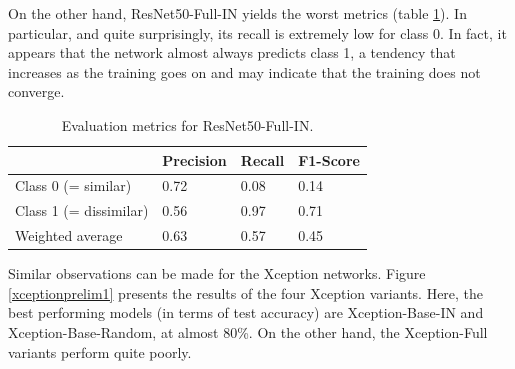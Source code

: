 \documentclass[11pt]{report}
\begin{document}
On the other hand, ResNet50-Full-IN yields the worst metrics (table \ref{tab:tabresprel2}). In particular, and quite surprisingly, its recall is extremely low for class 0. In fact, it appears that the network almost always predicts class 1, a tendency that increases as the training goes on and may indicate that the training does not converge.\newline

\begin{table}[h!]
\begin{tabular}{l|l|l|l|}
\cline{2-4}
                                             & Precision & Recall & F1-Score \\ \hline
\multicolumn{1}{|l|}{Class 0 (= similar)}    & 0.72      & 0.08   & 0.14     \\ \cline{1-1}
\multicolumn{1}{|l|}{Class 1 (= dissimilar)} & 0.56      & 0.97   & 0.71     \\ \hline
\multicolumn{1}{|l|}{Weighted average}       & 0.63      & 0.57   & 0.45     \\ \hline
\end{tabular}
\caption{Evaluation metrics for ResNet50-Full-IN.}
\label{tab:tabresprel2}
\end{table}

Similar observations can be made for the Xception networks. Figure \ref{xceptionprelim1} presents the results of the four Xception variants. Here, the best performing models (in terms of test accuracy) are Xception-Base-IN and Xception-Base-Random, at almost 80\%. On the other hand, the Xception-Full variants perform quite poorly.\newline
\end{document}
